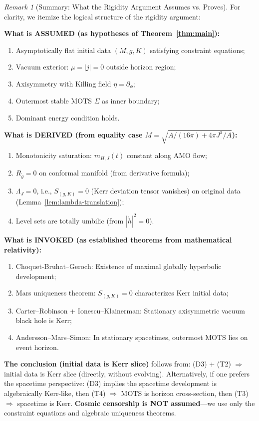 \documentclass[12pt]{article}
\theoremstyle{plain}
\theoremstyle{definition}
\theoremstyle{remark}
\newtheorem{remark}[theorem]{Remark}
\begin{document}
\begin{remark}[Summary: What the Rigidity Argument Assumes vs. Proves]\label{rem:rigidity-summary}
For clarity, we itemize the logical structure of the rigidity argument:

\textbf{What is ASSUMED (as hypotheses of Theorem~\ref{thm:main}):}
\begin{enumerate}
    \item[(A1)] Asymptotically flat initial data $(M, g, K)$ satisfying constraint equations;
    \item[(A2)] Vacuum exterior: $\mu = |j| = 0$ outside horizon region;
    \item[(A3)] Axisymmetry with Killing field $\eta = \partial_\phi$;
    \item[(A4)] Outermost stable MOTS $\Sigma$ as inner boundary;
    \item[(A5)] Dominant energy condition holds.
\end{enumerate}

\textbf{What is DERIVED (from equality case $M = \sqrt{A/(16\pi) + 4\pi J^2/A}$):}
\begin{enumerate}
    \item[(D1)] Monotonicity saturation: $m_{H,J}(t)$ constant along AMO flow;
    \item[(D2)] $R_{\tilde{g}} = 0$ on conformal manifold (from derivative formula);
    \item[(D3)] $\Lambda_J = 0$, i.e., $S_{(g,K)} = 0$ (Kerr deviation tensor vanishes) on original data (Lemma~\ref{lem:lambda-translation});
    \item[(D4)] Level sets are totally umbilic (from $|\mathring{h}|^2 = 0$).
\end{enumerate}

\textbf{What is INVOKED (as established theorems from mathematical relativity):}
\begin{enumerate}
    \item[(T1)] Choquet-Bruhat--Geroch: Existence of maximal globally hyperbolic development;
    \item[(T2)] Mars uniqueness theorem: $S_{(g,K)} = 0$ characterizes Kerr initial data;
    \item[(T3)] Carter--Robinson + Ionescu--Klainerman: Stationary axisymmetric vacuum black hole is Kerr;
    \item[(T4)] Andersson--Mars--Simon: In stationary spacetimes, outermost MOTS lies on event horizon.
\end{enumerate}

\textbf{The conclusion (initial data is Kerr slice)} follows from: (D3) + (T2) $\Rightarrow$ initial data is Kerr slice (directly, without evolving). Alternatively, if one prefers the spacetime perspective: (D3) implies the spacetime development is algebraically Kerr-like, then (T4) $\Rightarrow$ MOTS is horizon cross-section, then (T3) $\Rightarrow$ spacetime is Kerr. \textbf{Cosmic censorship is NOT assumed}---we use only the constraint equations and algebraic uniqueness theorems.
\end{remark}
\end{document}
